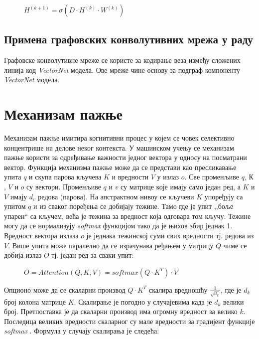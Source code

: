 \documentclass[11pt,oneside]{memoir}
\begin{document}
\begin{figure}[H]
  \centering
  $H^{(k+1)} = \sigma (D\cdot H^{(k)}\cdot W^{(k)})$
\end{figure}

\subsection{Примена графовских конволутивних мрежа у раду}

Графовске конволутивне мреже се користе за кодирање веза између сложених линија код \textit{VectorNet} \cite{vectornet} модела. Ове мреже
чине основу за подграф компоненту \textit{VectorNet} модела.

\section{Механизам пажње}

Механизам пажње имитира когнитивни процес у којем се човек селективно концентрише на делове неког контекста. У машинском учењу
се механизам пажње користи за одређивање важности једног вектора у односу на посматрани вектор. Функција механизма пажње може да се
представи као пресликавање упита $q$ и скупа парова кључева $K$ и вредности $V$ у излаз $o$. Све променљиве $q$, $К$, $V$ и $o$ су вектори.
Променљиве $q$ и $v$ су матрице које имају само један ред, а $K$ и $V$ имају $d_v$ редова (парова). 
На апстрактном нивоу се кључеви $K$ упоређују са упитом $q$ и из сваког поређења се добијају тежине. Тамо где је упит ,,боље упарен`` са кључем,
већа је тежина за вредност која одговара том кључу. Тежине могу да се нормализују \textit{softmax} функцијом тако да је њихов збир једнак 1.
Вредност вектора излаза $o$ је једнака тежинској суми свих вредности тј. редова из $V$. Више упита може паралелно да се израчунава ређањем
у матрицу $Q$ чиме се добија излаз $O$ тј. један ред за сваки упит:

\begin{figure}[H]
  \centering
  $O = Attention(Q, K, V) = softmax(Q\cdot K^T)\cdot V$
\end{figure}

Опционо може да се скаларни производ $Q\cdot K^T$ скалира вредношћу $\frac{1}{\sqrt{d_k}}$, где је $d_k$ број колона матрице $K$. Скалирање је погодно
у случајевима када је $d_k$ велики број. Претпоставка је да скаларни производ има огромну вредност за велико $k$. Последица великих вредности 
скаларног су мале вредности за градијент функције \textit{softmax} \cite{attention}. Формула у случају скалирања је следећа:
\end{document}
